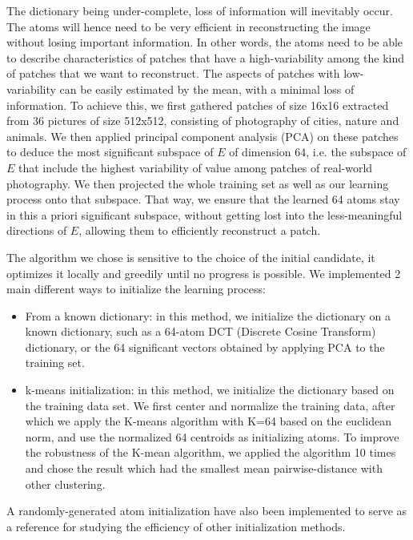 The dictionary being under-complete, loss of information will inevitably occur. The atoms will hence need to be very efficient in reconstructing the image without losing important information. In other words, the atoms need to be able to describe characteristics of patches that have a high-variability among the kind of patches that we want to reconstruct. The aspects of patches with low-variability can be easily estimated by the mean, with a minimal loss of information. 
To achieve this, we first gathered patches of size 16x16 extracted from 36 pictures of size 512x512, consisting of photography of cities, nature and animals. We then applied principal component analysis (PCA) on these patches to deduce the most significant subspace of $E$ of dimension 64, i.e. the subspace of $E$ that include the highest variability of value among patches of real-world photography. We then projected the whole training set as well as our learning process onto that subspace. That way, we ensure that the learned 64 atoms stay in this a priori significant subspace, without getting lost into the less-meaningful directions of $E$, allowing them to efficiently reconstruct a patch.

The algorithm we chose is sensitive to the choice of the initial candidate, it optimizes it locally and greedily until no progress is possible. We implemented 2 main different ways to initialize the learning process:
\begin{itemize}
   \item From a known dictionary: in this method, we initialize the dictionary on a known dictionary, such as a 64-atom DCT (Discrete Cosine Transform) dictionary, or the 64 significant vectors obtained by applying PCA to the training set.  
   \item k-means initialization: in this method, we initialize the dictionary based on the training data set. We first center and normalize the training data, after which we apply the K-means algorithm with K=64 based on the euclidean norm, and use the normalized 64 centroids as initializing atoms. To improve the robustness of the K-mean algorithm, we applied the algorithm 10 times and chose the result which had the smallest mean pairwise-distance with other clustering. 
\end{itemize}
A randomly-generated atom initialization have also been implemented to serve as a reference for studying the efficiency of other initialization methods. 

